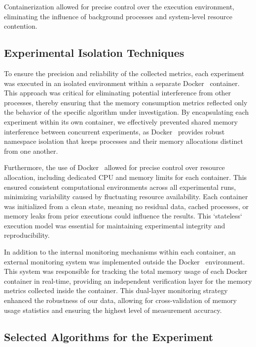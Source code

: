 Containerization allowed for precise control over the execution environment, eliminating the influence of background processes and system-level resource contention.

\subsection{Experimental Isolation Techniques}
\label{subsec:mmc-experimental-isolation-techniques}

To ensure the precision and reliability of the collected metrics, each experiment was executed in an isolated environment within a separate Docker~\cite{docker} container.
This approach was critical for eliminating potential interference from other processes, thereby ensuring that the memory consumption metrics reflected only the behavior of the specific algorithm under investigation.
By encapsulating each experiment within its own container, we effectively prevented shared memory interference between concurrent experiments, as Docker~\cite{docker} provides robust namespace isolation that keeps processes and their memory allocations distinct from one another.

Furthermore, the use of Docker~\cite{docker} allowed for precise control over resource allocation, including dedicated CPU and memory limits for each container.
This ensured consistent computational environments across all experimental runs, minimizing variability caused by fluctuating resource availability.
Each container was initialized from a clean state, meaning no residual data, cached processes, or memory leaks from prior executions could influence the results.
This `stateless` execution model was essential for maintaining experimental integrity and reproducibility.

In addition to the internal monitoring mechanisms within each container, an external monitoring system was implemented outside the Docker~\cite{docker} environment.
This system was responsible for tracking the total memory usage of each Docker~\cite{docker} container in real-time, providing an independent verification layer for the memory metrics collected inside the container.
This dual-layer monitoring strategy enhanced the robustness of our data, allowing for cross-validation of memory usage statistics and ensuring the highest level of measurement accuracy.

\subsection{Selected Algorithms for the Experiment}
\label{subsec:mmc-selected-algorithms-for-the-experiment}

